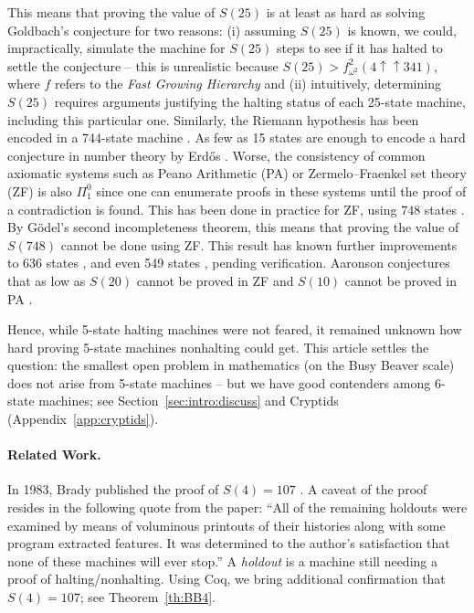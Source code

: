\documentclass[letterpaper,british,11pt]{article}
\theoremstyle{definition} %
\numberwithin{equation}{section}
\theoremstyle{definition} %
\newcommand{\BBtheFourth}{107}
\newcommand{\rado}{Rad\'o\xspace}
\begin{document}
This means that proving the value of $S(25)$ is at least as hard as solving Goldbach's conjecture for two reasons: (i) assuming $S(25)$ is known, we could, impractically, simulate the machine for $S(25)$ steps to see if it has halted to settle the conjecture -- this is unrealistic because $S(25) > f^2_{\omega^2}(4 \uparrow \uparrow 341)$, where $f$ refers to the \textit{Fast Growing Hierarchy} \cite{wikiChampions,wainer1970classification} and (ii) intuitively, determining $S(25)$ requires arguments justifying the halting status of each 25-state machine, including this particular one. Similarly, the Riemann hypothesis has been encoded in a 744-state machine \cite{RiemannTM,Yedidia2016,BusyBeaverFrontier}. As few as 15 states are enough to encode a hard conjecture in number theory by Erd\H{o}s \cite{BB15}. Worse, the consistency of common axiomatic systems such as Peano Arithmetic (PA) or Zermelo–Fraenkel set theory (ZF) is also $\Pi_1^0$ since one can enumerate proofs in these systems until the proof of a contradiction is found. This has been done in practice for ZF, using $748$ states \cite{BB748Thesis,Yedidia2016,BusyBeaverFrontier}. By G\"odel's second incompleteness theorem, this means that proving the value of $S(748)$ cannot be done using ZF. This result has known further improvements to 636 states \cite{RidenourZF636}, and even 549 states \cite{wade2025alignment}, pending verification. Aaronson conjectures that as low as $S(20)$ cannot be proved in ZF and $S(10)$ cannot be proved in PA \cite{BusyBeaverFrontier}.

\enlargethispage{\baselineskip}
Hence, while 5-state halting machines were not feared, it remained unknown how hard proving 5-state machines nonhalting could get. This article settles the question: the smallest open problem in mathematics (on the Busy Beaver scale) does not arise from 5-state machines -- but we have good contenders among 6-state machines; see Section~\ref{sec:intro:discuss} and Cryptids (Appendix~\ref{app:cryptids}).

\paragraph{Related Work.} In 1983, Brady published the proof of $S(4) = \BBtheFourth$ \cite{Brady83}. A caveat of the proof resides in the following quote from the paper: ``All of the remaining holdouts were examined by means of voluminous printouts of their histories along with some program extracted features. It was determined to the author's satisfaction that none of these machines will ever stop.'' A \textit{holdout} is a machine still needing a proof of halting/nonhalting. Using Coq, we bring additional confirmation that $S(4) = \BBtheFourth$; see Theorem~\ref{th:BB4}.
\end{document}
